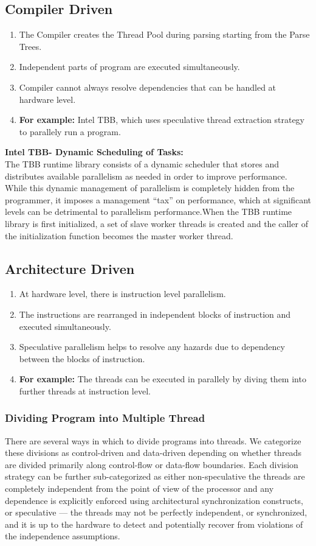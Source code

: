 \documentclass[a4paper,12pt]{article}
\begin{document}
\subsection{Compiler Driven}
\begin{enumerate}
\item The Compiler creates the Thread Pool during parsing starting from the Parse Trees.
\item Independent parts of program are executed simultaneously.
\item Compiler cannot always resolve dependencies that can be handled at hardware level.\cite{tls}
\item \textbf{For example:} Intel TBB, which uses speculative thread extraction strategy to parallely run a program.
\end{enumerate}
\textbf{Intel TBB- Dynamic Scheduling of Tasks: }
\\
The TBB runtime library consists of a dynamic scheduler that stores and distributes available parallelism as needed in order to improve performance. While this dynamic management of parallelism is completely hidden from the programmer, it imposes a management “tax” on performance, which at significant levels can be detrimental to parallelism performance.When the TBB runtime library is first initialized, a set of slave worker threads is created and the caller of the initialization function becomes the master worker thread.

\subsection{Architecture Driven}
\begin{enumerate}
\item At hardware level, there is instruction level parallelism.
\item The instructions are rearranged in independent blocks of instruction and executed simultaneously.
\item Speculative parallelism helps to resolve any hazards due to dependency between the blocks of instruction.
\item \textbf{For example:} The threads can be executed in parallely by diving them into further threads at instruction level.
\end{enumerate}
\subsubsection {Dividing Program into Multiple Thread}
There are several ways in which to divide programs into threads. We categorize these divisions as control-driven and data-driven depending on whether threads are divided primarily along control-flow or data-flow boundaries. Each division strategy can be further sub-categorized as either non-speculative the threads are completely independent from the point of view of the processor and any dependence is explicitly enforced using architectural synchronization constructs, or speculative — the threads may not be perfectly independent, or synchronized, and it is up to the hardware to detect and potentially recover from violations of the independence assumptions.
\end{document}

